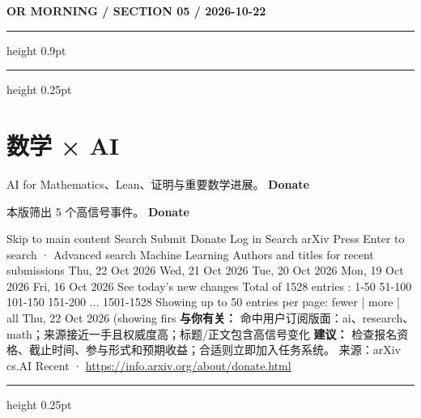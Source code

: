 \documentclass[10.5pt]{ctexart}
\begin{document}
\newpage
{\small\bfseries OR MORNING / SECTION 05 / 2026-10-22}
\vspace{2mm}
\hrule height 0.9pt
\vspace{1.5mm}
\hrule height 0.25pt
\vspace{4mm}
\section*{数学 × AI}
{\color{ormuted} AI for Mathematics、Lean、证明与重要数学进展。}
\vspace{2mm}
{\LARGE\bfseries Donate}\par
\vspace{1mm}
{\color{ormuted} 本版筛出 5 个高信号事件。}
\vspace{3mm}
{\Large\bfseries Donate}\par
Skip to main content Search Submit Donate Log in Search arXiv Press Enter to search · Advanced search Machine Learning Authors and titles for recent submissions Thu, 22 Oct 2026 Wed, 21 Oct 2026 Tue, 20 Oct 2026 Mon, 19 Oct 2026 Fri, 16 Oct 2026 See today's new changes Total of 1528 entries : 1-50 51-100 101-150 151-200 ... 1501-1528 Showing up to 50 entries per page: fewer | more | all Thu, 22 Oct 2026 (showing firs
\textbf{与你有关：} 命中用户订阅版面：ai、research、math；来源接近一手且权威度高；标题/正文包含高信号变化
\textbf{建议：} 检查报名资格、截止时间、参与形式和预期收益；合适则立即加入任务系统。
{\footnotesize\color{ormuted} 来源：arXiv cs.AI Recent · \url{https://info.arxiv.org/about/donate.html}}
\vspace{4mm}
\hrule height 0.25pt
\vspace{3mm}
\end{document}
